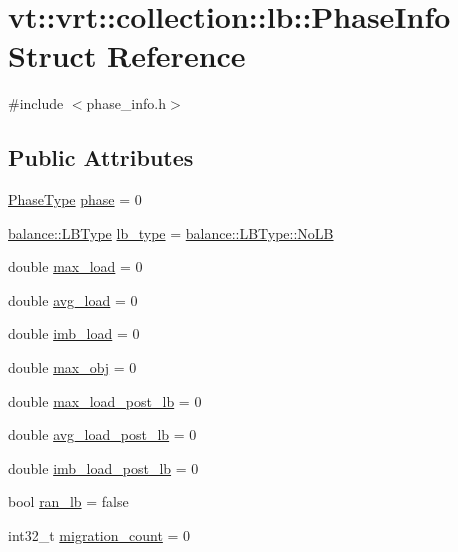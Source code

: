 \hypertarget{structvt_1_1vrt_1_1collection_1_1lb_1_1_phase_info}{}\section{vt\+:\+:vrt\+:\+:collection\+:\+:lb\+:\+:Phase\+Info Struct Reference}
\label{structvt_1_1vrt_1_1collection_1_1lb_1_1_phase_info}


{\ttfamily \#include $<$phase\+\_\+info.\+h$>$}

\subsection*{Public Attributes}
\begin{DoxyCompactItemize}
\item 
\hyperlink{namespacevt_a46ce6733d5cdbd735d561b7b4029f6d7}{Phase\+Type} \hyperlink{structvt_1_1vrt_1_1collection_1_1lb_1_1_phase_info_a7409c26a851895e977af3bcfdd1fd3ed}{phase} = 0
\item 
\hyperlink{namespacevt_1_1vrt_1_1collection_1_1balance_ac4f99693509affcc67db182d4aad9b5c}{balance\+::\+L\+B\+Type} \hyperlink{structvt_1_1vrt_1_1collection_1_1lb_1_1_phase_info_aee2cc2a019ebccb2d711254990a388cb}{lb\+\_\+type} = \hyperlink{namespacevt_1_1vrt_1_1collection_1_1balance_ac4f99693509affcc67db182d4aad9b5cad12268b59a4f1098aee001f9a1750020}{balance\+::\+L\+B\+Type\+::\+No\+LB}
\item 
double \hyperlink{structvt_1_1vrt_1_1collection_1_1lb_1_1_phase_info_a3e5214f6074c35a94e2bd4e8bcdb94c7}{max\+\_\+load} = 0
\item 
double \hyperlink{structvt_1_1vrt_1_1collection_1_1lb_1_1_phase_info_aa26235c0c1420830e3d306aa9457c051}{avg\+\_\+load} = 0
\item 
double \hyperlink{structvt_1_1vrt_1_1collection_1_1lb_1_1_phase_info_aa2a72fd325b6344d72b0d1fe0c85b7d3}{imb\+\_\+load} = 0
\item 
double \hyperlink{structvt_1_1vrt_1_1collection_1_1lb_1_1_phase_info_a562451552edd2b7e7c0bba8d0c3b07dd}{max\+\_\+obj} = 0
\item 
double \hyperlink{structvt_1_1vrt_1_1collection_1_1lb_1_1_phase_info_a25baef127911b1f127fe8e2383b2d94d}{max\+\_\+load\+\_\+post\+\_\+lb} = 0
\item 
double \hyperlink{structvt_1_1vrt_1_1collection_1_1lb_1_1_phase_info_afe2b2216be93511f42b8748a25c3750d}{avg\+\_\+load\+\_\+post\+\_\+lb} = 0
\item 
double \hyperlink{structvt_1_1vrt_1_1collection_1_1lb_1_1_phase_info_af0e626c6d373cfaca90e241632b0ea8f}{imb\+\_\+load\+\_\+post\+\_\+lb} = 0
\item 
bool \hyperlink{structvt_1_1vrt_1_1collection_1_1lb_1_1_phase_info_a91e5ba74353a80c830698664a0dd2a33}{ran\+\_\+lb} = false
\item 
int32\+\_\+t \hyperlink{structvt_1_1vrt_1_1collection_1_1lb_1_1_phase_info_a77c5d26718723ba37f1e60eebd6d49f5}{migration\+\_\+count} = 0
\end{DoxyCompactItemize}


